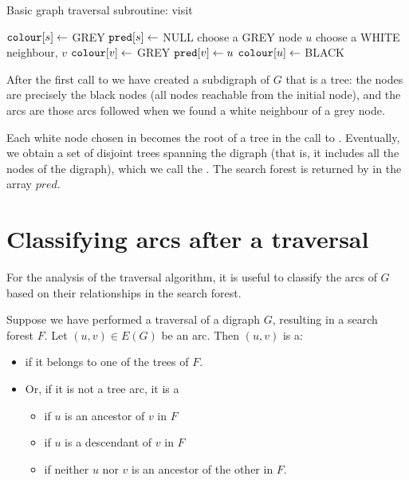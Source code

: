 \begin{algorithm}[H]
  \caption{Basic graph traversal subroutine: visit
    \label{alg:visit}}
\begin{algorithmic}[1]
	\State  $\colour[s] \gets$ GREY 
	\State $\pred[s] \gets$ NULL 
	 
		\State choose a GREY node $u$ 
			\State choose a WHITE neighbour, $v$ 
			\State $\colour[v] \gets $ GREY 
			\State $\pred[v] \gets u$ 
		\Else
			\State $\colour[u] \gets $ BLACK 
		\EndIf
	\EndWhile
\EndFunction
\end{algorithmic}
\end{algorithm}

After the first call to  we have created a subdigraph of $G$ that is a tree: the
nodes are precisely the black nodes (all nodes reachable from the initial node), and the arcs are those arcs followed when we found a white neighbour of a grey node. 

Each white node chosen in  becomes the root of a tree in the call to . Eventually, we obtain a
set of disjoint trees spanning the digraph (that is, it includes all the nodes of the digraph), which we call the
. The search forest  is returned by  in the array $pred$.

 


\section{Classifying arcs after a traversal}

For the analysis of the traversal algorithm, it is useful to classify the arcs of $G$ based on their relationships in the search forest.  

\begin{Definition}\label{defn:arc-types}
Suppose we have performed a traversal of a digraph $G$, resulting in a
search forest $F$.  Let $(u, v)\in E(G)$ be an arc. Then $(u, v)$ is a:
\begin{itemize} 
\item {} if it belongs to one of the trees of $F$. 
\item Or, if it is not a tree arc, it is a
\begin{itemize}
\item {} if $u$ is an ancestor of $v$ in $F$
\item {} if $u$ is a descendant of $v$ in $F$
\item {} if neither $u$ nor $v$ is an ancestor of the other in $F$.
\end{itemize}
\end{itemize}
\end{Definition} 

